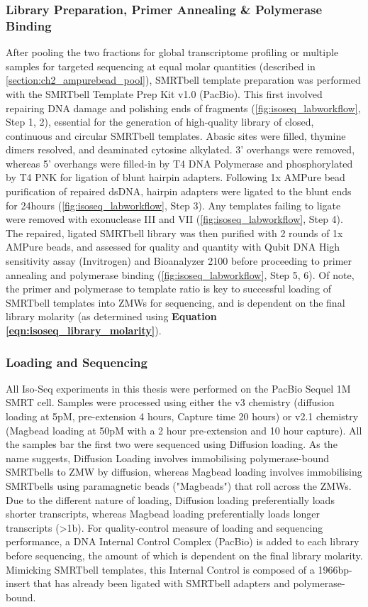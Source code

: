 \subsubsection{Library Preparation, Primer Annealing \& Polymerase Binding}
\label{section:ch2_smrtbelltemplate_explanation} 
After pooling the two fractions for global transcriptome profiling or multiple samples for targeted sequencing at equal molar quantities (described in \cref{section:ch2_ampurebead_pool}), SMRTbell template preparation was performed with the SMRTbell Template Prep Kit v1.0 (PacBio). This first involved repairing DNA damage and polishing ends of fragments (\cref{fig:isoseq_labworkflow}, Step 1, 2), essential for the generation of high-quality library of closed, continuous and circular SMRTbell templates. Abasic sites were filled, thymine dimers resolved, and deaminated cytosine alkylated. 3’ overhangs were removed, whereas 5’ overhangs were filled-in by T4 DNA Polymerase and phosphorylated by T4 PNK for ligation of blunt hairpin adapters. Following 1x AMPure bead purification of repaired dsDNA, hairpin adapters were ligated to the blunt ends for 24hours (\cref{fig:isoseq_labworkflow}, Step 3). Any templates failing to ligate were removed with exonuclease III and VII (\cref{fig:isoseq_labworkflow}, Step 4). The repaired, ligated SMRTbell library was then purified with 2 rounds of 1x AMPure beads, and assessed for quality and quantity with Qubit DNA High sensitivity assay (Invitrogen) and Bioanalyzer 2100 before proceeding to primer annealing and polymerase binding (\cref{fig:isoseq_labworkflow}, Step 5, 6). Of note, the primer and polymerase to template ratio is key to successful loading of SMRTbell templates into ZMWs for sequencing, and is dependent on the final library molarity (as determined using \textbf{Equation \ref{eqn:isoseq_library_molarity}}). 


\subsubsection{Loading and Sequencing} 
\label{section:ch2_sequencing}
All Iso-Seq experiments in this thesis were performed on the PacBio Sequel 1M SMRT cell. Samples were processed using either the v3 chemistry (diffusion loading at 5pM, pre-extension 4 hours, Capture time 20 hours) or v2.1 chemistry (Magbead loading at 50pM with a 2 hour pre-extension and 10 hour capture). All the samples bar the first two were sequenced using Diffusion loading. As the name suggests, Diffusion Loading involves immobilising polymerase-bound SMRTbells to ZMW by diffusion, whereas Magbead loading involves immobilising SMRTbells using paramagnetic beads ("Magbeads") that roll across the ZMWs. Due to the different nature of loading, Diffusion loading preferentially loads shorter transcripts, whereas Magbead loading preferentially loads longer transcripts (>1b). For quality-control measure of loading and sequencing performance, a DNA Internal Control Complex (PacBio) is added to each library before sequencing, the amount of which is dependent on the final library molarity. Mimicking SMRTbell templates, this Internal Control is composed of a 1966bp-insert that has already been ligated with SMRTbell adapters and polymerase-bound.



